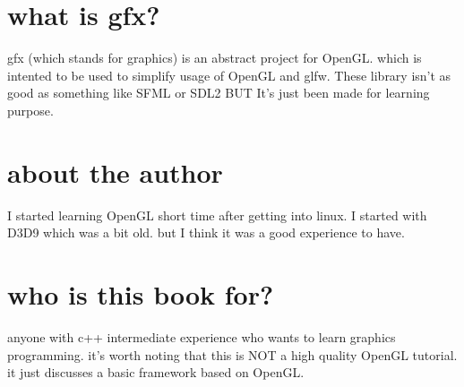 \section{what is gfx?}
  gfx (which stands for graphics) is an abstract project for OpenGL. 
  which is intented to be used to simplify usage of OpenGL and glfw.
  These library isn't as good as something
  like SFML or SDL2 BUT It's just been made for learning purpose.

\section{about the author}
  I started learning OpenGL short time after getting into linux.
  I started with D3D9 which was a bit old. but I think it was a
  good experience to have.

\section{who is this book for?}
  anyone with c++ intermediate experience who wants to learn graphics programming.
  it's worth noting that this is NOT a high quality OpenGL tutorial. it just discusses
  a basic framework based on OpenGL.
